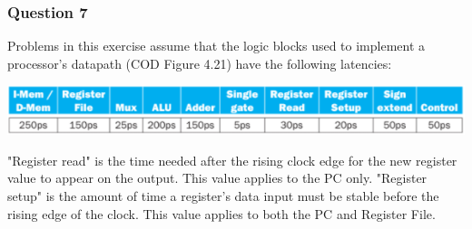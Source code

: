 \documentclass[11pt]{article}
\begin{document}
\setcounter{subsubsection}{6}
\subsubsection{Question 7}
Problems in this exercise assume that the logic blocks used to implement a processor's datapath (COD Figure 4.21) have the following latencies:
\begin{center}\includegraphics[scale=0.6]{q7_image}\\\end{center}
"Register read" is the time needed after the rising clock edge for the new register value to appear on the output. This value applies to the PC only. "Register setup" is the amount of time a register's data input must be stable before the rising edge of the clock. This value applies to both the PC and Register File.
\end{document}

